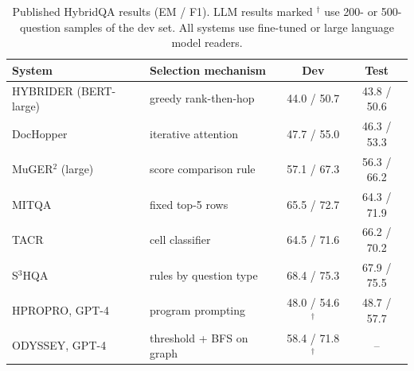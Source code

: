 \begin{table}[t]
\centering
\small
\caption{Published HybridQA results (EM / F1). LLM results marked $^\dagger$ use 200- or 500-question samples of the dev set. All systems use fine-tuned or large language model readers.}
\label{tab:hybridqa-published}
\begin{tabular}{@{}llcc@{}}
\toprule
System & Selection mechanism & Dev & Test \\
\midrule
HYBRIDER (BERT-large) \citep{chen-etal-2020-hybridqa} & greedy rank-then-hop & 44.0 / 50.7 & 43.8 / 50.6 \\
DocHopper \citep{sun2021iterative} & iterative attention & 47.7 / 55.0 & 46.3 / 53.3 \\
MuGER$^2$ (large) \citep{wang-etal-2022-muger2} & score comparison rule & 57.1 / 67.3 & 56.3 / 66.2 \\
MITQA \citep{kumar-etal-2023-multi} & fixed top-5 rows & 65.5 / 72.7 & 64.3 / 71.9 \\
TACR \citep{wu-etal-2023-tacr} & cell classifier & 64.5 / 71.6 & 66.2 / 70.2 \\
S$^3$HQA \citep{lei-etal-2023-s3hqa} & rules by question type & 68.4 / 75.3 & 67.9 / 75.5 \\
HPROPRO, GPT-4 \citep{shi-etal-2024-exploring} & program prompting & 48.0 / 54.6$^\dagger$ & 48.7 / 57.7 \\
ODYSSEY, GPT-4 \citep{agarwal-etal-2025-hybrid} & threshold + BFS on graph & 58.4 / 71.8$^\dagger$ & -- \\
\bottomrule
\end{tabular}
\end{table}

